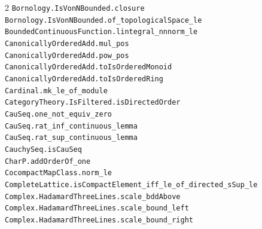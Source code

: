 \documentclass[10pt,a4paper]{article}
\begin{document}
\begin{multicols}{2}
\texttt{Bornology.\allowbreak{}IsVonNBounded.\allowbreak{}closure} \\
\texttt{Bornology.\allowbreak{}IsVonNBounded.\allowbreak{}of\_topologicalSpace\_le} \\
\texttt{BoundedContinuousFunction.\allowbreak{}lintegral\_nnnorm\_le} \\
\texttt{CanonicallyOrderedAdd.\allowbreak{}mul\_pos} \\
\texttt{CanonicallyOrderedAdd.\allowbreak{}pow\_pos} \\
\texttt{CanonicallyOrderedAdd.\allowbreak{}toIsOrderedMonoid} \\
\texttt{CanonicallyOrderedAdd.\allowbreak{}toIsOrderedRing} \\
\texttt{Cardinal.\allowbreak{}mk\_le\_of\_module} \\
\texttt{CategoryTheory.\allowbreak{}IsFiltered.\allowbreak{}isDirectedOrder} \\
\texttt{CauSeq.\allowbreak{}one\_not\_equiv\_zero} \\
\texttt{CauSeq.\allowbreak{}rat\_inf\_continuous\_lemma} \\
\texttt{CauSeq.\allowbreak{}rat\_sup\_continuous\_lemma} \\
\texttt{CauchySeq.\allowbreak{}isCauSeq} \\
\texttt{CharP.\allowbreak{}addOrderOf\_one} \\
\texttt{CocompactMapClass.\allowbreak{}norm\_le} \\
\texttt{CompleteLattice.\allowbreak{}isCompactElement\_iff\_le\_of\_directed\_sSup\_le} \\
\texttt{Complex.\allowbreak{}HadamardThreeLines.\allowbreak{}scale\_bddAbove} \\
\texttt{Complex.\allowbreak{}HadamardThreeLines.\allowbreak{}scale\_bound\_left} \\
\texttt{Complex.\allowbreak{}HadamardThreeLines.\allowbreak{}scale\_bound\_right} \\

\end{multicols}
\end{document}
